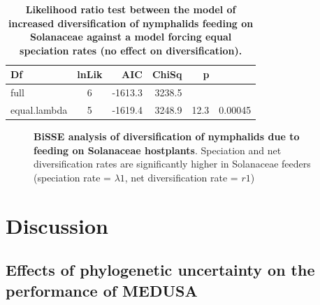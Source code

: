 \documentclass[10pt,letterpaper]{article}
\begin{document}
\begin{table}[!ht]
    \caption{{\bf Likelihood ratio test between the model of increased
diversification of nymphalids feeding on Solanaceae against a model
forcing equal speciation rates (no effect on diversification).}}
\begin{tabular}{|l|c|r|r|l|r|}
    \hline
Df           & lnLik & AIC     & ChiSq  & \multicolumn{1}{r}{p} &         \\ \hline
full         & 6     & -1613.3 & 3238.5 &                       &         \\ \hline
equal.lambda & 5     & -1619.4 & 3248.9 & 12.3                  & 0.00045 \\ \hline
\end{tabular}
\begin{flushleft}
\end{flushleft}
\label{table3}
\end{table}

\begin{figure}[h]
\caption{{\bf BiSSE analysis of diversification of nymphalids due
to feeding on Solanaceae hostplants}.
Speciation and net diversification
rates are significantly higher in Solanaceae feeders (speciation rate =
$\lambda1$, net diversification rate = $r1$)}
\label{fig4}
\end{figure}

\section*{Discussion}

\subsection*{Effects of phylogenetic uncertainty on the performance of
MEDUSA}
\end{document}

